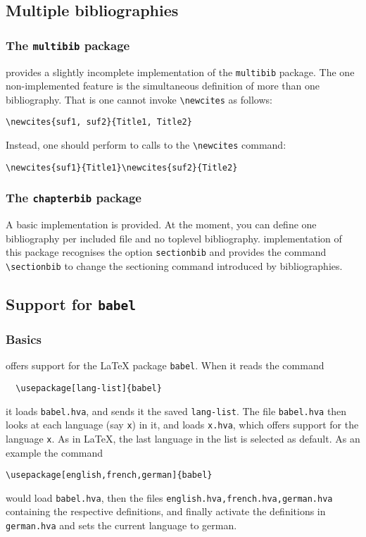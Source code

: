 \subsection{Multiple bibliographies}

\subsubsection*{The \texttt{multibib} package}
\hevea{} provides a slightly incomplete implementation of the
\texttt{multibib} package. The one non-implemented feature is the
simultaneous definition of more than one bibliography.
That is one cannot invoke \verb+\newcites+ as follows:
\begin{verbatim}
\newcites{suf1, suf2}{Title1, Title2}
\end{verbatim}
Instead, one should perform to calls to the \verb+\newcites+ command:
\begin{verbatim}
\newcites{suf1}{Title1}\newcites{suf2}{Title2}
\end{verbatim}


\subsubsection*{The \texttt{chapterbib} package}
A basic implementation is provided. At the moment, you can
define one bibliography per included file and no toplevel
bibliography.
\hevea{} implementation of this package recognises the option
\verb+sectionbib+ and provides the command \verb+\sectionbib+
to change the sectioning command introduced by bibliographies.


\subsection{Support for \texttt{babel}}
\subsubsection{Basics}
\hevea{} offers support for the \LaTeX{} package {\tt babel}. When it reads the command
\begin{verbatim}
  \usepackage[lang-list]{babel}
\end{verbatim}
it loads {\tt babel.hva}, and sends it the saved {\tt lang-list}. The
file {\tt babel.hva} then looks at each language (say {\tt{}x}) in it, and loads {\tt x.hva}, which offers support for the language {\tt x}. As in \LaTeX, the last language in the list is selected as default. As an example the command
\begin{verbatim}
\usepackage[english,french,german]{babel}
\end{verbatim}
would load {\tt babel.hva}, then the files {\tt english.hva,french.hva,german.hva} containing the respective definitions, and finally activate the definitions in {\tt german.hva} and sets the current language to german.

